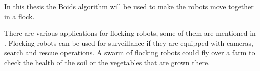In this thesis the Boids algorithm will be used to make the robots move together in a flock. 

There are various applications for flocking robots, some of them are mentioned in \citep{Csaba}. Flocking robots can be used for surveillance if they are equipped with cameras, search and rescue operations. A swarm of flocking robots could fly over a farm to check the health of the soil or the vegetables that are grown there. 



